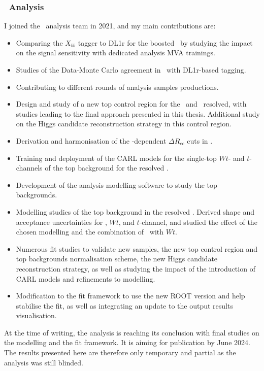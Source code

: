 \subsubsection{\boldvhbc\ Analysis}
I joined the \vhbc\ analysis team in 2021, and my main contributions are:
\begin{itemize}
    \item Comparing the $X_{bb}$ tagger to DL1r for the boosted \vhb\ by studying the impact on the signal sensitivity with dedicated analysis MVA trainings.
    \item Studies of the Data-Monte Carlo agreement in \vhc\ with DL1r-based tagging. 
    \item Contributing to different rounds of analysis samples productions.
    \item Design and study of a new top control region for the \vhc\ and \vhb\ resolved, with studies leading to the final approach presented in this thesis. Additional study on the Higgs candidate reconstruction strategy in this control region.
    \item Derivation and harmonisation of the \ptv-dependent $\Delta R_{cc}$ cuts in \vhc.
    \item Training and deployment of the CARL models for the single-top $Wt$- and $t$-channels of the top background for the resolved \vhb.
    \item Development of the analysis modelling software to study the top backgrounds. 
    \item Modelling studies of the top background in the resolved \vhb. Derived shape and acceptance uncertainties for \ttb, $Wt$, and $t$-channel, and studied the effect of the chosen modelling and the combination of \ttb\ with $Wt$. 
    \item Numerous fit studies to validate new samples, the new top control region and top backgrounds normalisation scheme, the new Higgs candidate reconstruction strategy, as well as studying the impact of the introduction of CARL models and refinements to modelling. 
    \item Modification to the fit framework to use the new ROOT version and help stabilise the fit, as well as integrating an update to the output results visualisation.
\end{itemize}
At the time of writing, the analysis is reaching its conclusion with final studies on the modelling and the fit framework. It is aiming for publication by June 2024. The results presented here are therefore only temporary and partial as the analysis was still blinded.
